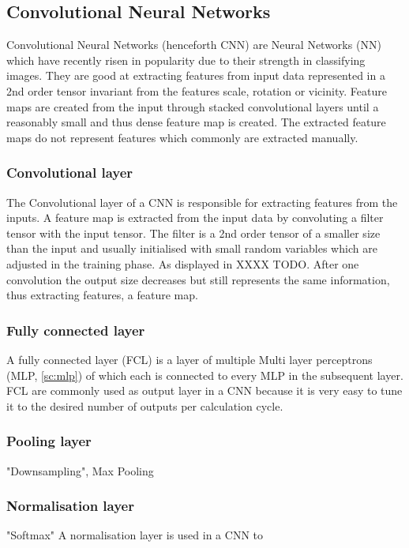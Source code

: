 \documentclass[journal]{IEEEtran}
\begin{document}
\subsection{Convolutional Neural Networks}
Convolutional Neural Networks (henceforth CNN) are Neural Networks (NN) which have recently risen in popularity due to their strength in classifying images. They are good at extracting features from input data represented in a 2nd order tensor invariant from the features scale, rotation or vicinity. Feature maps are created from the input through stacked convolutional layers until a reasonably small and thus dense feature map is created. The extracted feature maps do not represent features which commonly are extracted manually. 
\subsubsection{Convolutional layer}
The Convolutional layer of a CNN is responsible for extracting features from the inputs. A feature map is extracted from the input data by convoluting a filter tensor with the input tensor. The filter is a 2nd order tensor of a smaller size than the input and usually initialised with small random variables which are adjusted in the training phase. As displayed in XXXX TODO. After one convolution the output size decreases but still represents the same information, thus extracting features, a feature map.  
\subsubsection{Fully connected layer}
\label{sssec:fcl}
A fully connected layer (FCL) is a layer of multiple Multi layer perceptrons (MLP, \autoref{sc:mlp}) of which each is connected to every MLP in the subsequent layer. FCL are commonly used as output layer in a CNN because it is very easy to tune it to the desired number of outputs per calculation cycle.

\subsubsection{Pooling layer}
"Downsampling", Max Pooling
\subsubsection{Normalisation layer}
"Softmax" A normalisation layer is used in a CNN to 
\end{document}

